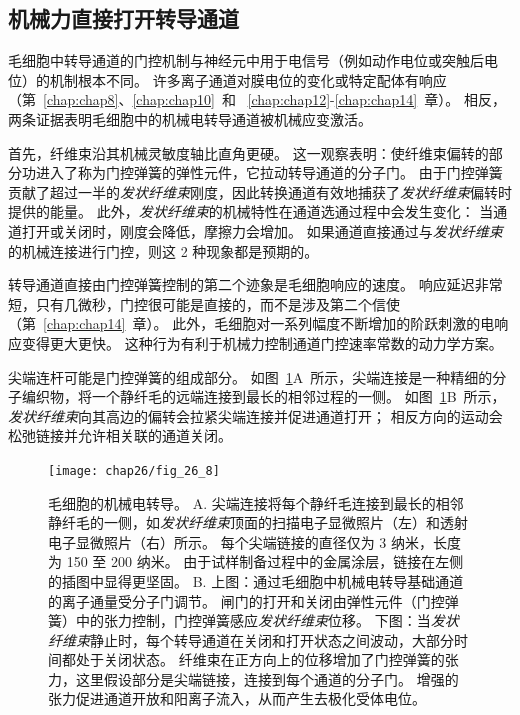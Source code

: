 \subsection{机械力直接打开转导通道}

毛细胞中转导通道的门控机制与神经元中用于电信号（例如动作电位或突触后电位）的机制根本不同。
许多离子通道对膜电位的变化或特定配体有响应（第~\ref{chap:chap8}、\ref{chap:chap10}~和 ~\ref{chap:chap12}-\ref{chap:chap14}~章）。
相反，两条证据表明毛细胞中的机械电转导通道被机械应变激活。


首先，纤维束沿其机械灵敏度轴比直角更硬。
这一观察表明：使纤维束偏转的部分功进入了称为门控弹簧的弹性元件，它拉动转导通道的分子门。
由于门控弹簧贡献了超过一半的\textit{发状纤维束}刚度，因此转换通道有效地捕获了\textit{发状纤维束}偏转时提供的能量。
此外，\textit{发状纤维束}的机械特性在通道选通过程中会发生变化：
当通道打开或关闭时，刚度会降低，摩擦力会增加。
如果通道直接通过与\textit{发状纤维束}的机械连接进行门控，则这 2 种现象都是预期的。


转导通道直接由门控弹簧控制的第二个迹象是毛细胞响应的速度。
响应延迟非常短，只有几微秒，门控很可能是直接的，而不是涉及第二个信使（第~\ref{chap:chap14}~章）。
此外，毛细胞对一系列幅度不断增加的阶跃刺激的电响应变得更大更快。
这种行为有利于机械力控制通道门控速率常数的动力学方案。


尖端连杆可能是门控弹簧的组成部分。
如图~\ref{fig:26_8}A~所示，尖端连接是一种精细的分子编织物，将一个静纤毛的远端连接到最长的相邻过程的一侧。
如图~\ref{fig:26_8}B~所示，\textit{发状纤维束}向其高边的偏转会拉紧尖端连接并促进通道打开；
相反方向的运动会松弛链接并允许相关联的通道关闭。


\begin{figure}[htbp]
	\centering
	\texttt{[image: chap26/fig\_26\_8]}
	\caption{毛细胞的机械电转导。
		A. 尖端连接将每个静纤毛连接到最长的相邻静纤毛的一侧，如\textit{发状纤维束}顶面的扫描电子显微照片（左）和透射电子显微照片（右）所示。
		每个尖端链接的直径仅为 3 纳米，长度为 150 至 200 纳米。
		由于试样制备过程中的金属涂层，链接在左侧的插图中显得更坚固\cite{assad1991tip,hudspeth1994pulling}。
		B. 上图：通过毛细胞中机械电转导基础通道的离子通量受分子门调节。
		闸门的打开和关闭由弹性元件（门控弹簧）中的张力控制，门控弹簧感应\textit{发状纤维束}位移\cite{howard1988compliance}。
		下图：当\textit{发状纤维束}静止时，每个转导通道在关闭和打开状态之间波动，大部分时间都处于关闭状态。
		纤维束在正方向上的位移增加了门控弹簧的张力，这里假设部分是尖端链接，连接到每个通道的分子门。
		增强的张力促进通道开放和阳离子流入，从而产生去极化受体电位\cite{hudspeth1989ear}。}
	\label{fig:26_8}
\end{figure}


